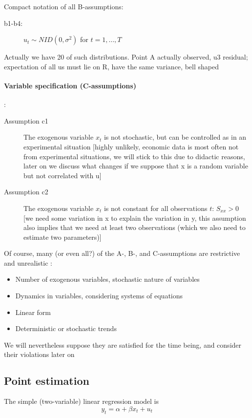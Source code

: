 \documentclass{article}
\begin{document}
Compact notation of all B-assumptions: 
\begin{description}
	\item[b1-b4:] $u_{t}\sim NID(0,\sigma ^{2})$ for $t=1,\ldots ,T$
\end{description} 
Actually we have 20 of such distributions. Point A actually observed, u3 residual; expectation of all us must lie on R, have the same variance, bell shaped

\paragraph{Variable specification (C-assumptions)}:

\begin{description}
	\item[Assumption c1] The exogenous variable $x_{t}$ is not stochastic, but
	can be controlled as in an experimental situation
	[highly unlikely, economic data is most often not from experimental situations, we will stick to this due to didactic reasons, later on we discuss what changes if we suppose that x is a random variable but not correlated with u]
	\item[Assumption c2] The exogenous variable $x_{t}$ is not constant for all
	observations $t$: $S_{xx}>0$
	[we need some variation in x to explain the variation in y, this assumption also implies that we need at least two observations (which we also need to estimate two parameters)]
\end{description}

Of course, many (or even all?) of the A-, B-, and C-assumptions are	restrictive and unrealistic	:
\begin{itemize}
	\item Number of exogenous variables, stochastic nature of variables
	\item Dynamics in variables, considering systems of equations
	\item Linear form
	\item Deterministic or stochastic trends
\end{itemize}

We will nevertheless suppose they are satisfied for the time being, and consider their violations later on


\subsection{Point estimation}

The simple (two-variable) linear regression model is
	\begin{equation*}
	y_{t}=\alpha +\beta x_{t}+u_{t}
	\end{equation*}
\end{document}
